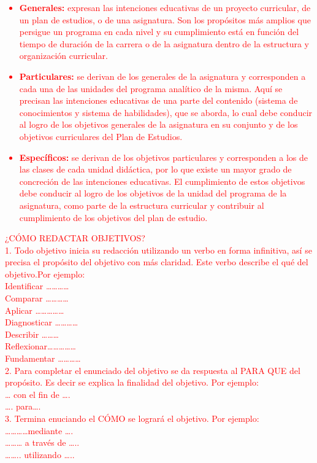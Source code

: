 \documentclass[12pt,letterpaper]{report}
\begin{document}
	\textcolor{red}{
	\begin{itemize}
	\item \textbf{Generales: }expresan las intenciones educativas de un proyecto curricular, de un plan
de estudios, o de una asignatura. Son los propósitos más amplios que persigue un
programa en cada nivel y su cumplimiento está en función del tiempo de duración de
la carrera o de la asignatura dentro de la estructura y organización curricular.
	\item 
	\textbf{Particulares:} se derivan de los generales de la asignatura y corresponden a cada una
de las unidades del programa analítico de la misma. Aquí se precisan las intenciones
educativas de una parte del contenido (sistema de conocimientos y sistema de
habilidades), que se aborda, lo cual debe conducir al logro de los objetivos generales
de la asignatura en su conjunto y de los objetivos curriculares del Plan de Estudios.
	\item 
	\textbf{Específicos:} se derivan de los objetivos particulares y corresponden a los de las clases
de cada unidad didáctica, por lo que existe un mayor grado de concreción de las
intenciones educativas. El cumplimiento de estos objetivos debe conducir al logro de
los objetivos de la unidad del programa de la asignatura, como parte de la estructura
curricular y contribuir al cumplimiento de los objetivos del plan de estudio.
	\end{itemize}	
	¿CÓMO REDACTAR OBJETIVOS?\\
1. Todo objetivo inicia su redacción utilizando un verbo en forma infinitiva, así se
precisa el propósito del objetivo con más claridad. Este verbo describe el qué del
objetivo.Por ejemplo:\\
Identificar …………\\
Comparar …………\\
Aplicar ……………\\
Diagnosticar …………\\
Describir ………\\
Reflexionar……………\\
Fundamentar …………\\
2. Para completar el enunciado del objetivo se da respuesta al PARA QUE del
propósito. Es decir se explica la finalidad del objetivo. Por ejemplo:\\
… con el fin de ….\\
…. para….\\
3. Termina enuciando el CÓMO se logrará el objetivo. Por ejemplo:\\
…………mediante ….\\
……… a través de …..\\
…….. utilizando …..\\
	}
	
\end{document}
